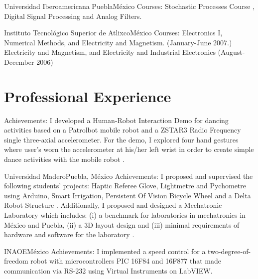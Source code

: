 \documentclass[10pt,a4paper,roman]{moderncv}
\begin{document}
{Universidad Iberoamericana Puebla}{M\'exico}{}
{Courses: Stochastic Processes Course
\href{https://sites.google.com/site/perezxochicale/stochastic-processes-course}{\faExternalLink},
Digital Signal Processing
\href{https://sites.google.com/site/perezxochicale/digital-signal-processing-course}{\faExternalLink}
and Analog Filters.
}

{Instituto Tecnol\'ogico Superior de Atlixco}{M\'exico}{}
{Courses: Electronics I, Numerical Methods, and Electricity and Magnetism. (January-June 2007.)
Electricity and Magnetism, and Electricity and Industrial Electronics (August-December 2006)
}


\section{Professional Experience}

{Achievements: I developed a Human-Robot Interaction Demo for dancing activities based on 
a Patrolbot mobile robot and a ZSTAR3 Radio Frequency single three-axial accelerometer.
For the demo, I explored four hand gestures where user's worn the accelerometer at his/her 
left wrist in order to create simple dance activities with the mobile robot
\href{https://sites.google.com/site/perezxochicale/projects/demodance}{\faExternalLink}.
}

{Universidad Madero}{Puebla, M\'exico}{}
{Achievements:
I proposed and supervised the following students' projects: Haptic Referee Glove,
 Lightmetre and Pychometre using Arduino, Smart Irrigation, Persistent Of Vision Bicycle Wheel
 and a Delta Robot Structure 
\href{https://sites.google.com/site/perezxochicaleprojects/studentprojects}{\faExternalLink}.
Additionally, I proposed and designed a Mechatronic Laboratory which includes: 
(i) a benchmark for laboratories in mechatronics in M\'exico and Puebla, 
(ii) a 3D layout design and 
(iii) minimal requirements of hardware and software for the laboratory
 \href{https://sites.google.com/site/perezxochicaleprojects/mechatronicslaboratorydesign}{\faExternalLink}.
}

{INAOE}{M\'exico}{}
{Achievements:
I implemented a speed control for a two-degree-of-freedom robot with microcontrollers
PIC 16F84 and 16F877 that made communication via RS-232 using Virtual Instruments on LabVIEW.}
\end{document}
